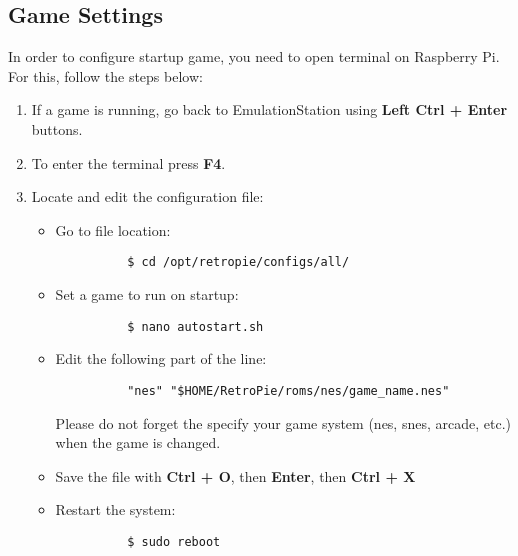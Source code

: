 \subsection{Game Settings}
\label{subsec:game_settings}

In order to configure startup game, you need to open terminal on Raspberry Pi. For this, follow the steps below:

\begin{enumerate}
  \item If a game is running, go back to EmulationStation using \textbf{Left Ctrl + Enter} buttons.
  \item To enter the terminal press \textbf{F4}.
  \item Locate and edit the configuration file:
    \begin{itemize}
      \item Go to file location:
        \begin{verbatim}
          $ cd /opt/retropie/configs/all/
        \end{verbatim}
      \item Set a game to run on startup:
        \begin{verbatim}
          $ nano autostart.sh
        \end{verbatim}
      \item Edit the following part of the line:
        \begin{verbatim}
          "nes" "$HOME/RetroPie/roms/nes/game_name.nes"
        \end{verbatim}
        Please do not forget the specify your game system (nes, snes, arcade, etc.) when the game is changed.
      \item Save the file with \textbf{Ctrl + O}, then \textbf{Enter}, then \textbf{Ctrl + X}
      \item Restart the system:
        \begin{verbatim}
          $ sudo reboot
        \end{verbatim}

    \end{itemize}
\end{enumerate}



